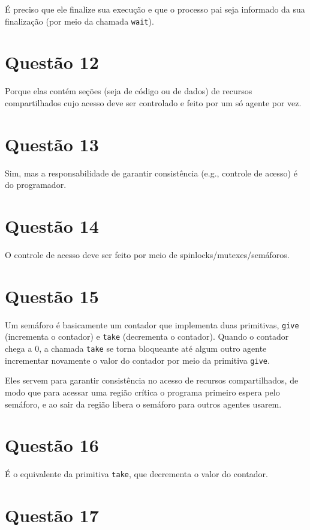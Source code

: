 \documentclass{article}
\begin{document}
É preciso que ele finalize sua execução e que o processo pai seja informado da sua finalização (por meio da chamada \texttt{wait}).

\section*{Questão 12}

Porque elas contém seções (seja de código ou de dados) de recursos compartilhados cujo acesso deve ser controlado e feito por um só agente por vez.

\section*{Questão 13}

Sim, mas a responsabilidade de garantir consistência (e.g., controle de acesso) é do programador.

\section*{Questão 14}

O controle de acesso deve ser feito por meio de spinlocks/mutexes/semáforos.


\section*{Questão 15}

Um semáforo é basicamente um contador que implementa duas primitivas, \texttt{give} (incrementa o contador) e \texttt{take} (decrementa o contador). Quando o contador chega a $0$, a chamada \texttt{take} se torna bloqueante até algum outro agente incrementar novamente o valor do contador por meio da primitiva \texttt{give}.

Eles servem para garantir consistência no acesso de recursos compartilhados, de modo que para acessar uma região crítica o programa primeiro espera pelo semáforo, e ao sair da região libera o semáforo para outros agentes usarem.

\section*{Questão 16}

É o equivalente da primitiva \texttt{take}, que decrementa o valor do contador.

\section*{Questão 17}
\end{document}
